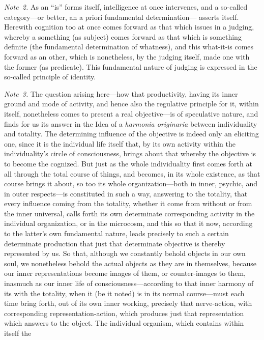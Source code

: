 \documentclass[12pt,a4paper]{book}
\begin{document}
{\small\emph{Note~2.} As an ``is'' forms itself, intelligence at once intervenes,
and a so-called category---or better, an a priori fundamental determination---%
asserts itself. Herewith cognition too at once comes forward as that which issues
in a judging, whereby a something (as subject) comes forward as that which is
something definite (the fundamental determination of whatness), and this
what-it-is comes forward as an other, which is nonetheless, by the judging itself,
made one with the former (as predicate). This fundamental nature of judging is
expressed in the so-called principle of identity.\par}

{\small\emph{Note~3.} The question arising here---how that productivity, having
its inner ground and mode of activity, and hence also the regulative principle for
it, within itself, nonetheless comes to present a real objective---is of
speculative nature, and finds for us its answer in the Idea of a
\textit{harmonia originaria} between individuality and totality. The determining
influence of the objective is indeed only an eliciting one, since it is the
individual life itself that, by its own activity within the individuality's circle
of consciousness, brings about that whereby the objective is to become the
cognized. But just as the whole individuality first comes forth at all through the
total course of things, and becomes, in its whole existence, as that course brings
it about, so too its whole organization---both in inner, psychic, and in outer
respects---is constituted in such a way, answering to the totality, that every
influence coming from the totality, whether it come from without or from the inner
universal, calls forth its own determinate corresponding activity in the
individual organization, or in the microcosm, and this so that it now, according
to the latter's own fundamental nature, leads precisely to such a certain
determinate production that just that determinate objective is thereby represented
by us. So that, although we constantly behold objects in our own soul, we
nonetheless behold the actual objects as they are in themselves, because our inner
representations become images of them, or counter-images to them, inasmuch as our
inner life of consciousness---according to that inner harmony of its with the
totality, when it (be it noted) is in its normal course---must each time bring
forth, out of its own inner working, precisely that nerve-action, with
corresponding representation-action, which produces just that representation which
answers to the object. The individual organism, which contains within itself the
}
\end{document}
